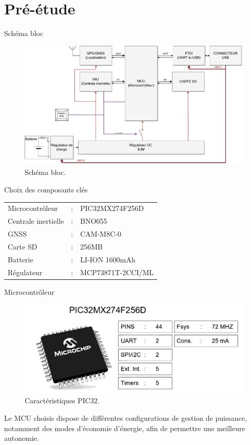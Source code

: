 \documentclass{beamer}
\begin{document}
\section{Pré-étude}
\begin{frame}{Schéma bloc}
	\begin{figure}[h]
		\centering
		\includegraphics[width=1\textwidth]{../figures/cdc/blocs_grossiers_no_antenna}
		\caption{Schéma bloc.}
		\label{fig:schbloc}
	\end{figure}
\end{frame}

\begin{frame}{Choix des composants clés}
	\begin{tabular}{lll}
		Microcontrôleur &:& PIC32MX274F256D \\
		Centrale inertielle &:& BNO055 \\
		GNSS &:& CAM-M8C-0 \\
		Carte SD &:& 256MB \\
		Batterie &:& LI-ION 1600mAh \\
		Régulateur &:& MCP73871T-2CCI/ML\\
	\end{tabular}
\end{frame}

\begin{frame}{Microcontrôleur}
	\begin{figure}[h]
		\centering
		\includegraphics[width=0.7\linewidth]{../figures/pre_etude/Carac_PIC32}
		\caption{Caractéristiques PIC32.}
	\end{figure}
	Le MCU choisis dispose de différentes configurations de gestion de puissance, notamment des modes d'économie d'énergie, afin de permettre une meilleure autonomie. 
\end{frame}
\end{document}
